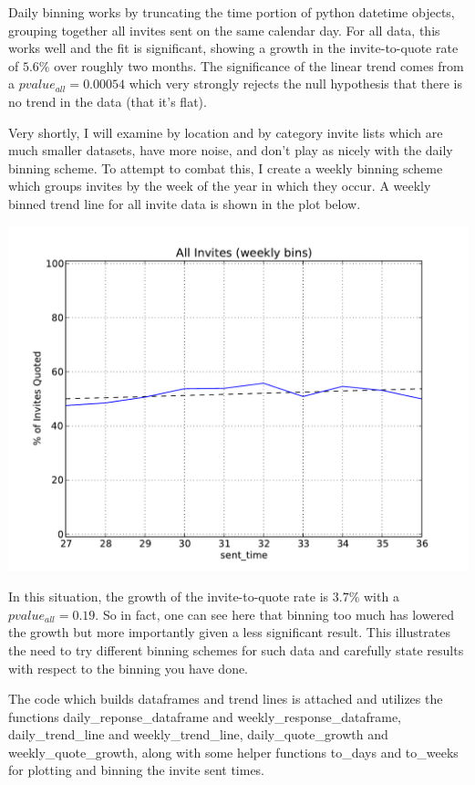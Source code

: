\documentclass{article}[12pt]
\begin{document}
\noindent
Daily binning works by truncating the time portion of python datetime objects, grouping 
together all invites sent on the same calendar day. For all data, this works well and the fit is
significant, showing a growth in the invite-to-quote rate of $5.6\%$ over roughly two months.
The significance of the linear trend comes from a $pvalue_{all} = 0.00054$ which very strongly
rejects the null hypothesis that there is no trend in the data (that it's flat).

Very shortly, I will examine by location and by category invite lists which are much smaller datasets,
have more noise, and don't play as nicely with the daily binning scheme. To attempt to combat this, I 
create a weekly binning scheme which groups invites by the week of the year in which they occur. A
weekly binned trend line for all invite data is shown in the plot below.

\includegraphics[scale=0.7]{../All_Invites_weekly.pdf}

In this situation, the growth of the invite-to-quote rate is $3.7\%$ with a $pvalue_{all} = 0.19$. So in fact, one can see here that binning too much has lowered the growth but more importantly given a less significant result. This illustrates the need to try different binning schemes for such data and carefully state results with respect to the binning you have done.

The code which builds dataframes and trend lines is attached and utilizes the functions
daily\_reponse\_dataframe and weekly\_response\_dataframe, daily\_trend\_line and weekly\_trend\_line,
daily\_quote\_growth and weekly\_quote\_growth, along with some helper functions to\_days and to\_weeks
for plotting and binning the invite sent times.
\end{document}
